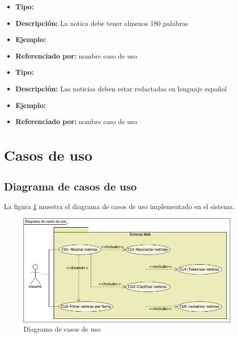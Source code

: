   \begin{itemize}
    \item \textbf{Tipo:}  
    \item \textbf{Descripción:}  La notica debe tener almenos 180 palabras
    \item \textbf{Ejemplo:}
    \item \textbf{Referenciado por:} nombre caso de uso \\
  \end{itemize}


  \begin{itemize}
    \item \textbf{Tipo:}  
    \item \textbf{Descripción:}  Las noticias deben estar redactadas en lenguaje español
    \item \textbf{Ejemplo:}
    \item \textbf{Referenciado por:} nombre caso de uso \\
  \end{itemize}



\newpage
\section{Casos de uso}


\subsection{Diagrama de casos de uso}
La figura \ref{fig:DCU} muestra el diagrama de casos de uso implementado en el sistema.

\begin{figure}[h]
  \centering
  \includegraphics[scale=.4]{imagenes/Diagramas/CasosDeuso}
  \caption{Diagrama de casos de uso}
  \label{fig:DCU}
\end{figure}

